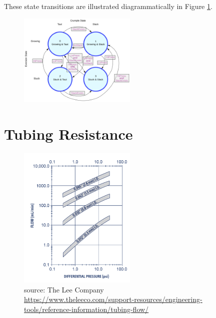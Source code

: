 \documentclass[letterpaper]{article}
\begin{document}
These state transitions are illustrated diagrammatically in Figure \ref{4x4StateDiagram}.

\begin{figure}[h]\centering
        \includegraphics[width=0.5\textwidth]{4x4StateTransDiag.png}
        \caption{}\label{4x4StateDiagram}
\end{figure}



%



\section{Tubing Resistance}


\begin{figure}
\includegraphics[width=0.5\textwidth]{TubingResChart.png}
\caption{source: The Lee Company  \\ \url{https://www.theleeco.com/support-resources/engineering-tools/reference-information/tubing-flow/}}
\end{figure}
\end{document}
